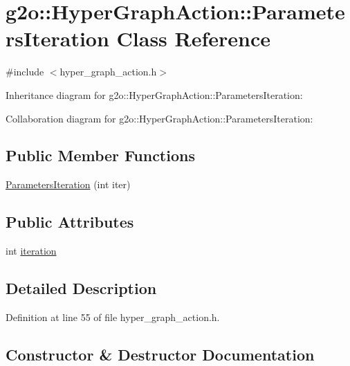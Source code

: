 \hypertarget{classg2o_1_1HyperGraphAction_1_1ParametersIteration}{}\section{g2o\+:\+:Hyper\+Graph\+Action\+:\+:Parameters\+Iteration Class Reference}
\label{classg2o_1_1HyperGraphAction_1_1ParametersIteration}


{\ttfamily \#include $<$hyper\+\_\+graph\+\_\+action.\+h$>$}



Inheritance diagram for g2o\+:\+:Hyper\+Graph\+Action\+:\+:Parameters\+Iteration\+:


Collaboration diagram for g2o\+:\+:Hyper\+Graph\+Action\+:\+:Parameters\+Iteration\+:
\subsection*{Public Member Functions}
\begin{DoxyCompactItemize}
\item 
\hyperlink{classg2o_1_1HyperGraphAction_1_1ParametersIteration_ae6849a5bec7eac20ba0f2b0892212694}{Parameters\+Iteration} (int iter)
\end{DoxyCompactItemize}
\subsection*{Public Attributes}
\begin{DoxyCompactItemize}
\item 
int \hyperlink{classg2o_1_1HyperGraphAction_1_1ParametersIteration_a6ec1e8c9333e75e9531bebe055e23ce2}{iteration}
\end{DoxyCompactItemize}


\subsection{Detailed Description}


Definition at line 55 of file hyper\+\_\+graph\+\_\+action.\+h.



\subsection{Constructor \& Destructor Documentation}
